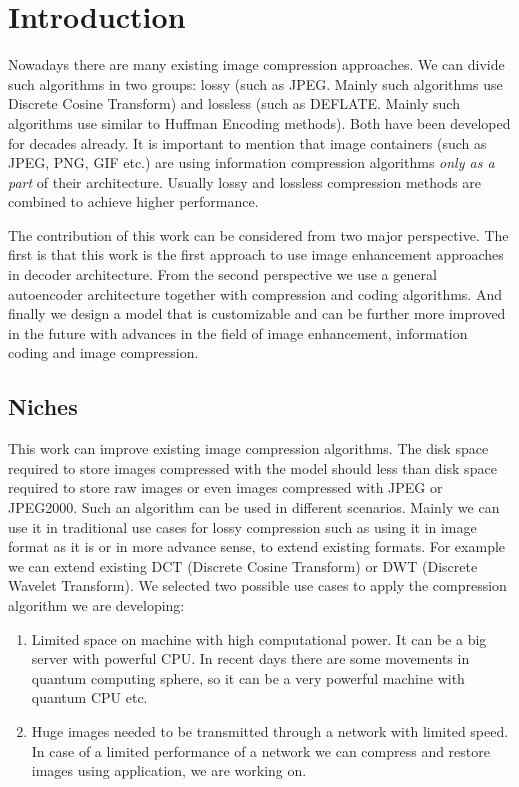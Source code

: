 \chapter{Introduction}

Nowadays there are many existing image compression approaches. We can divide such algorithms in two groups: lossy (such as JPEG. Mainly such algorithms use Discrete Cosine Transform) and lossless (such as DEFLATE. Mainly such algorithms use similar to Huffman Encoding methods). Both have been developed for decades already. It is important to mention that image containers (such as JPEG, PNG, GIF etc.) are using information compression algorithms \textit{only as a part} of their architecture. Usually lossy and lossless compression methods are combined to achieve higher performance.

The contribution of this work can be considered from two major perspective. The first is that this work is the first approach to use image enhancement approaches in decoder architecture. From the second perspective we use a general autoencoder architecture together with compression and coding algorithms. And finally we design a model that is customizable and can be further more improved in the future with advances in the field of image enhancement, information coding and image compression.

\section{Niches}

This work can improve existing image compression algorithms. The disk space required to store images compressed with the model should less than disk space required to store raw images or even images compressed with JPEG or JPEG2000. Such an algorithm can be used in different scenarios. Mainly we can use it in traditional use cases for lossy compression such as using it in image format as it is or in more advance sense, to extend existing formats. For example we can extend existing DCT (Discrete Cosine Transform) or DWT (Discrete Wavelet Transform). We selected two possible use cases to apply the compression algorithm we are developing:

\begin{enumerate}
    \item Limited space on machine with high computational power. It can be a big server with powerful CPU. In recent days there are some movements in quantum computing sphere, so it can be a very powerful machine with quantum CPU etc.
    \item Huge images needed to be transmitted through a network with limited speed. In case of a limited performance of a network we can compress and restore images using application, we are working on.
\end{enumerate}

